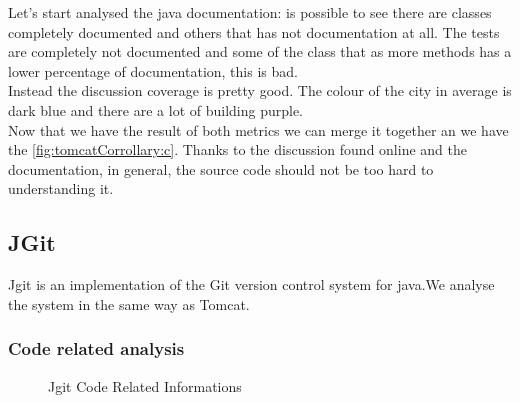 \documentclass[]{usiinfbachelorproject}
\begin{document}
Let's start analysed the java documentation:  is possible to see there are classes completely documented and others that has not documentation at all. The tests are completely not documented and some of the class that as more methods has a lower percentage of documentation, this is bad.\\
Instead the discussion coverage is pretty good. The colour of the city in average is dark blue and there are a lot of building purple.\\
Now that we have the result of both metrics we can merge it together an we have the  \ref{fig:tomcatCorrollary:c}. Thanks to the discussion found online and the documentation, in general, the source code should not be too hard to understanding it.
 

 

\newpage
\subsection{JGit}
Jgit is an implementation of the Git version control system for java.We analyse the system in the same way as Tomcat.
\subsubsection{Code related analysis}


\begin{figure}[h]
\hspace*{\fill}


\caption{Jgit Code Related Informations \label{fig:jgitRel}
}
\end{figure}
\end{document}
